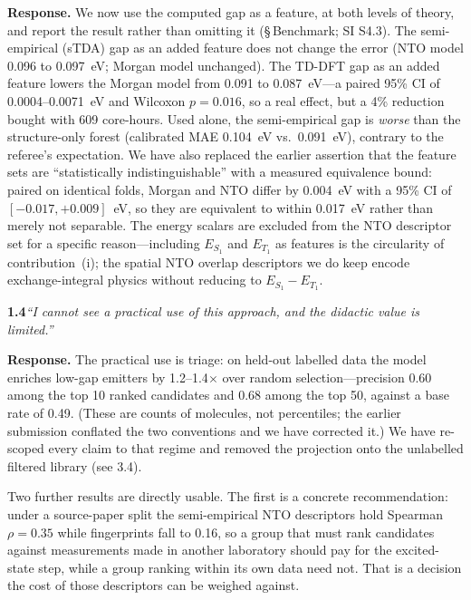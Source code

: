 \documentclass[12pt,a4paper]{letter}
\begin{document}
\smallskip
\noindent\textbf{Response.}
We now use the computed gap as a feature, at both levels of theory, and report
the result rather than omitting it (\S\,Benchmark; SI S4.3). The semi-empirical
(sTDA) gap as an added feature does not change the error (NTO model
\num{0.096} to \num{0.097}~eV; Morgan model unchanged). The TD-DFT gap as an
added feature lowers the Morgan model from \num{0.091} to \num{0.087}~eV---a
paired \num{95}\% CI of \numrange{0.0004}{0.0071}~eV and Wilcoxon $p = 0.016$, so
a real effect, but a \num{4}\% reduction bought with \num{609} core-hours. Used
alone, the semi-empirical gap is \emph{worse} than the structure-only forest
(calibrated MAE \num{0.104}~eV vs.\ \num{0.091}~eV), contrary to the referee's
expectation. We have also replaced the earlier assertion that the feature sets are
``statistically indistinguishable'' with a measured equivalence bound: paired on
identical folds, Morgan and NTO differ by \num{0.004}~eV with a \num{95}\% CI of
$[-0.017, +0.009]$~eV, so they are equivalent to within \num{0.017}~eV rather than
merely not separable. The energy scalars are excluded from the NTO descriptor set for a
specific reason---including $E_{S_1}$ and $E_{T_1}$ as features is the circularity
of contribution~(i); the spatial NTO overlap descriptors we do keep encode
exchange-integral physics without reducing to $E_{S_1}-E_{T_1}$.

\medskip
\noindent\textbf{1.4}\quad\textit{``I cannot see a practical use of this approach,
and the didactic value is limited.''}

\smallskip
\noindent\textbf{Response.}
The practical use is triage: on held-out labelled data the model enriches low-gap
emitters by \num{1.2}--\num{1.4}$\times$ over random selection---precision
\num{0.60} among the top \num{10} ranked candidates and \num{0.68} among the top
\num{50}, against a base rate of \num{0.49}. (These are counts of molecules, not
percentiles; the earlier submission conflated the two conventions and we have corrected
it.) We have re-scoped every claim to that regime and removed the projection onto the
unlabelled filtered library (see 3.4).

Two further results are directly usable. The first is a concrete recommendation: under a
source-paper split the semi-empirical NTO descriptors hold Spearman $\rho = \num{0.35}$
while fingerprints fall to \num{0.16}, so a group that must rank candidates against
measurements made in another laboratory should pay for the excited-state step, while a
group ranking within its own data need not. That is a decision the cost of those
descriptors can be weighed against.
\end{document}
